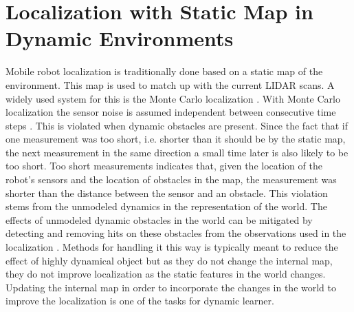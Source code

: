 \section{Localization with Static Map in Dynamic Environments}
Mobile robot localization is traditionally done based on a static map of the environment. This map is used to match up with the current LIDAR scans. A widely used system for this is the Monte Carlo localization \cite{probRob}. 
With Monte Carlo localization the sensor noise is assumed independent between consecutive time steps \cite{probRob}. This is violated when dynamic obstacles are present. Since the fact that if one measurement was too short, i.e. shorter than it should be by the static map, the next measurement in the same direction a small time later is also likely to be too short. Too short measurements indicates that, given the location of the robot’s sensors and the location of obstacles in the map, the measurement was shorter than the distance between the sensor and an obstacle. This violation stems from the unmodeled dynamics in the representation of the world. The effects of unmodeled dynamic obstacles in the world can be mitigated by detecting and removing hits on these obstacles from the observations used in the localization \cite{tang2015approach}\cite{fox1998position}. Methods for handling it this way is typically meant to reduce the effect of highly dynamical object but as they do not change the internal map, they do not improve localization as the static features in the world changes. Updating the internal map in order to incorporate the changes in the world to improve the localization is one of the tasks for dynamic learner. 
